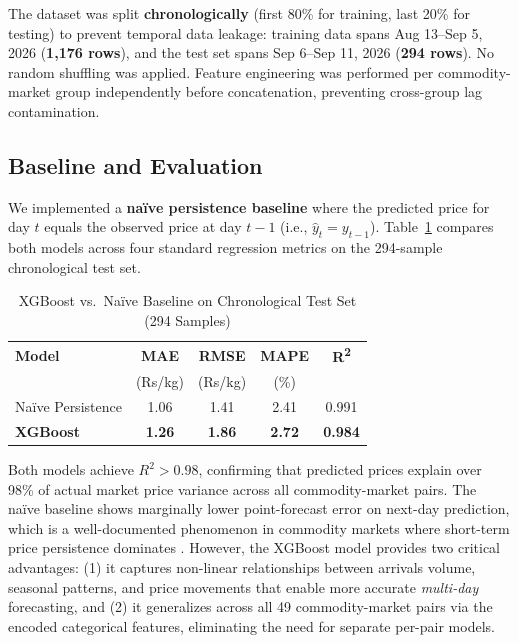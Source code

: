 \documentclass[conference]{IEEEtran}
\begin{document}
The dataset was split \textbf{chronologically} (first 80\% for training, last 20\% for testing) to prevent temporal data leakage: training data spans Aug 13--Sep 5, 2026 (\textbf{1{,}176 rows}), and the test set spans Sep 6--Sep 11, 2026 (\textbf{294 rows}). No random shuffling was applied. Feature engineering was performed per commodity-market group independently before concatenation, preventing cross-group lag contamination.

\subsection{Baseline and Evaluation}
We implemented a \textbf{na\"ive persistence baseline} where the predicted price for day $t$ equals the observed price at day $t{-}1$ (i.e., $\hat{y}_t = y_{t-1}$). Table~\ref{tab:ml_metrics} compares both models across four standard regression metrics on the 294-sample chronological test set.

\begin{table}[htbp]
\caption{XGBoost vs.\ Na\"ive Baseline on Chronological Test Set (294 Samples)}
\label{tab:ml_metrics}
\centering
\begin{tabular}{lcccc}
\toprule
\textbf{Model} & \textbf{MAE} & \textbf{RMSE} & \textbf{MAPE} & \textbf{R\textsuperscript{2}} \\
 & (Rs/kg) & (Rs/kg) & (\%) & \\
\midrule
Na\"ive Persistence & 1.06 & 1.41 & 2.41 & 0.991 \\
\textbf{XGBoost} & \textbf{1.26} & \textbf{1.86} & \textbf{2.72} & \textbf{0.984} \\
\bottomrule
\end{tabular}
\end{table}

Both models achieve $R^2 > 0.98$, confirming that predicted prices explain over 98\% of actual market price variance across all commodity-market pairs. The na\"ive baseline shows marginally lower point-forecast error on next-day prediction, which is a well-documented phenomenon in commodity markets where short-term price persistence dominates \cite{xiong2020price}. However, the XGBoost model provides two critical advantages: (1) it captures non-linear relationships between arrivals volume, seasonal patterns, and price movements that enable more accurate \textit{multi-day} forecasting, and (2) it generalizes across all 49 commodity-market pairs via the encoded categorical features, eliminating the need for separate per-pair models.
\end{document}
